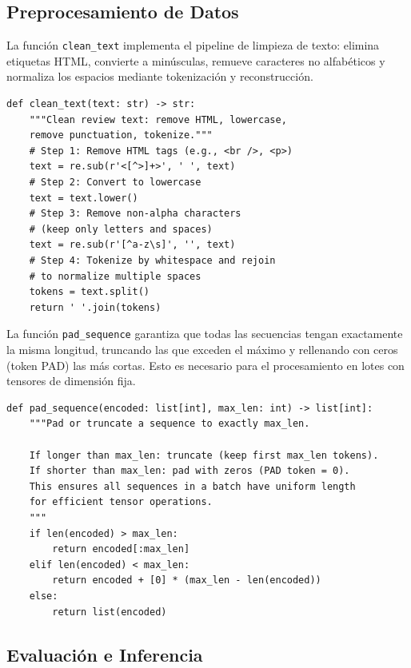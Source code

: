 \subsection{Preprocesamiento de Datos}

La función \texttt{clean\_text} implementa el pipeline de limpieza de texto: elimina etiquetas HTML, convierte a minúsculas, remueve caracteres no alfabéticos y normaliza los espacios mediante tokenización y reconstrucción.

\begin{verbatim}
def clean_text(text: str) -> str:
    """Clean review text: remove HTML, lowercase,
    remove punctuation, tokenize."""
    # Step 1: Remove HTML tags (e.g., <br />, <p>)
    text = re.sub(r'<[^>]+>', ' ', text)
    # Step 2: Convert to lowercase
    text = text.lower()
    # Step 3: Remove non-alpha characters
    # (keep only letters and spaces)
    text = re.sub(r'[^a-z\s]', '', text)
    # Step 4: Tokenize by whitespace and rejoin
    # to normalize multiple spaces
    tokens = text.split()
    return ' '.join(tokens)
\end{verbatim}

La función \texttt{pad\_sequence} garantiza que todas las secuencias tengan exactamente la misma longitud, truncando las que exceden el máximo y rellenando con ceros (token PAD) las más cortas. Esto es necesario para el procesamiento en lotes con tensores de dimensión fija.

\begin{verbatim}
def pad_sequence(encoded: list[int], max_len: int) -> list[int]:
    """Pad or truncate a sequence to exactly max_len.

    If longer than max_len: truncate (keep first max_len tokens).
    If shorter than max_len: pad with zeros (PAD token = 0).
    This ensures all sequences in a batch have uniform length
    for efficient tensor operations.
    """
    if len(encoded) > max_len:
        return encoded[:max_len]
    elif len(encoded) < max_len:
        return encoded + [0] * (max_len - len(encoded))
    else:
        return list(encoded)
\end{verbatim}


\subsection{Evaluación e Inferencia}

